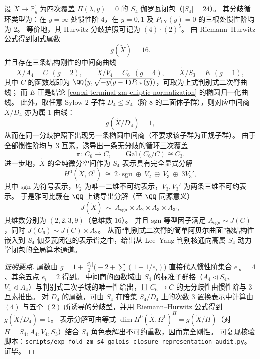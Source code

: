 \begin{conclusion}[\texorpdfstring{$S_4$}{S4} 伽罗瓦闭包曲线的属、子群塔与全纯微分的表示分解：\texorpdfstring{$g=16$}{g=16} 与 \texorpdfstring{$H^{0}(\Omega^{1})$}{H0(Omega1)} 的不可约谱]\label{con:xi-terminal-zm-s4-galois-closure-genus-tower-holomorphic-differentials}
设 \(\widetilde{X}\to\mathbb{P}^{1}_{y}\) 为四次覆盖 \(\Pi(\lambda,y)=0\) 的 \(S_{4}\) 伽罗瓦闭包（\(|S_{4}|=24\)）。
其分歧循环类型为：在 \(y=\infty\) 处惯性阶 \(4\)，在 \(y=0,1\) 及 \(P_{\mathrm{LY}}(y)=0\) 的三根处惯性阶均为 \(2\)。
等价地，其 Hurwitz 分歧护照可记为 \((4)\cdot(2)^5\)。
由 Riemann--Hurwitz 公式得到闭式属数
\[
g(\widetilde{X})=16.
\]
并且存在三条结构刚性的中间商曲线
\[
\widetilde{X}/A_{4}=C\ \ (g=2),\qquad \widetilde{X}/V_{4}=C_{6}\ \ (g=4),\qquad \widetilde{X}/S_{3}=E\ \ (g=1),
\]
其中 \(C\) 的函数域即为 \(\QQ\bigl(y,\sqrt{-y(y-1)P_{\mathrm{LY}}(y)}\bigr)\)，可取为上式判别式二次脊曲线；
而 \(E\) 正是结论 \ref{con:xi-terminal-zm-elliptic-normalization} 的椭圆归一化曲线。
此外，取任意 Sylow \(2\)-子群 \(D_{4}\le S_{4}\)（阶 \(8\) 的二面体子群），则对应中间商 \(\widetilde{X}/D_{4}\) 亦为属 \(1\) 曲线：
\[
g(\widetilde{X}/D_{4})=1,
\]
从而在同一分歧护照下出现另一条椭圆中间商（不要求该子群为正规子群）。
由于全部惯性阶均与 \(3\) 互素，诱导出一条无分歧的循环三次覆盖
\[
\pi:\ C_{6}\longrightarrow C,\qquad \mathrm{Gal}(C_{6}/C)\cong C_{3}.
\]
进一步地，\(\widetilde{X}\) 的全纯微分空间作为 \(S_{4}\)-表示具有完全显式分解
\[
H^{0}(\widetilde{X},\Omega^{1})\ \cong\ 2\cdot \mathrm{sgn}\ \oplus\ V_{2}\ \oplus\ V_{3}\ \oplus\ 3V_{3}',
\]
其中 \(\mathrm{sgn}\) 为符号表示，\(V_{2}\) 为唯一二维不可约表示，\(V_{3},V_{3}'\) 为两条三维不可约表示。
于是雅可比簇在 \(\QQ\) 上诱导出分解（至 \(\QQ\)-同源意义）
\[
J(\widetilde{X})\ \sim\ A_{\mathrm{sgn}}\times A_{2}\times A_{3}\times A_{3'},
\]
其维数分别为 \((2,2,3,9)\)（总维数 \(16\)）。
并且 \(\mathrm{sgn}\)-等型因子满足 \(A_{\mathrm{sgn}}\sim J(C)\)，同时 \(J(C_{6})\sim J(C)\times A_{2}\)。
从而“判别式二次脊的简单阿贝尔曲面”被结构性嵌入到 \(S_{4}\) 伽罗瓦闭包的表示谱之中，给出从 Lee--Yang 判别核通向高属 \(S_{4}\) 动力学闭包的全局算术通道。
\end{conclusion}
\begin{proof}[证明要点]
属数由
\(
g=1+\frac{|S_4|}{2}\bigl(-2+\sum(1-1/e_i)\bigr)
\)
直接代入惯性阶集合 \(e_\infty=4\)、其余五点 \(e_i=2\) 得到。
中间商的函数域由 \(S_4\) 的标准子群格（\(A_4\lhd S_4\)、\(V_4\lhd A_4\)）与判别式二次子域的唯一性给出，且 \(C_6\to C\) 的无分歧性由惯性阶与 \(3\) 互素推出。
对 \(D_4\) 的属数，可由 \(S_4\) 在陪集 \(S_4/D_4\) 上的次数 \(3\) 置换表示中计算由 \((4)\) 与五个 \((2)\) 所诱导的分歧型，并用 Riemann--Hurwitz 公式得到 \(g(\widetilde{X}/D_4)=1\)。
表示分解可由等式 \(\dim H^{0}(\widetilde{X},\Omega^{1})^{H}=g(\widetilde{X}/H)\)（对 \(H=S_4,A_4,V_4,S_3\)）结合 \(S_4\) 角色表解出不可约重数，因而完全刚性。
可复现核验脚本：\texttt{scripts/exp\_fold\_zm\_s4\_galois\_closure\_representation\_audit.py}。证毕。
\end{proof}

